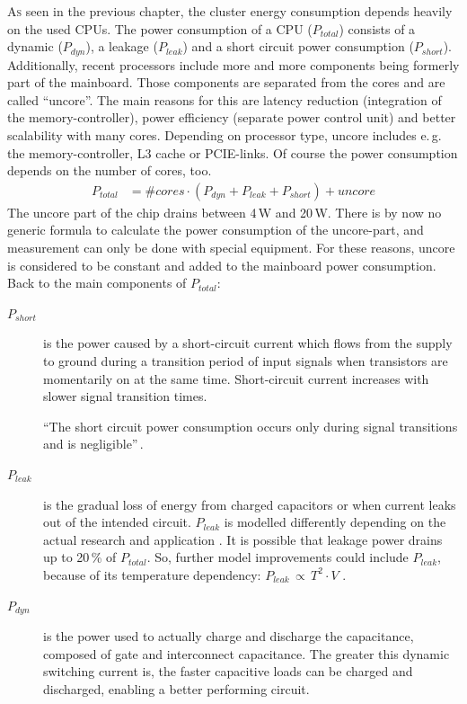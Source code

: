 \bigskip
\lettrine[lines=2, lhang=.1, lraise=.1]{A}{s} seen in the previous chapter, the cluster energy consumption depends heavily on the used CPUs. The power consumption of a CPU ($P_{total}$) consists of a dynamic ($P_{dyn}$), a leakage ($P_{leak}$) and a short circuit power consumption ($P_{short}$). Additionally, recent processors include more and more components being formerly part of the mainboard. Those components are separated from the cores and are called ``uncore''. The main reasons for this are latency reduction (integration of the memory-controller), power efficiency (separate power control unit) and better scalability with many cores. Depending on processor type, uncore includes e.\,g. the memory-controller, L3 cache or PCIE-links. Of course the power consumption depends on the number of cores, too.
%
\begin{align}
P_{total} &= \#cores \cdot ( P_{dyn} + P_{leak} + P_{short} ) + uncore\nonumber
\end{align}
%
The uncore part of the chip drains between 4\,W and 20\,W. There is by now no generic formula to calculate the power consumption of the uncore-part, and measurement can only be done with special equipment\cite{ht4uCPU}. For these reasons, uncore is considered to be constant and added to the mainboard power consumption.\\[4em]
%
Back to the main components of $P_{total}$:
%
\begin{description}
	\item[$P_{short}$] is the power caused by a short-circuit current which flows from the supply to ground during a transition period of input signals when transistors are momentarily on at the same time. Short-circuit current increases with slower signal transition times\cite{HOT96}.

``The short circuit power consumption occurs only during signal transitions and is negligible''\,\cite{martin}.

	\item[$P_{leak}$] is the gradual loss of energy from charged capacitors or when current leaks out of the intended circuit. $P_{leak}$ is modelled differently depending on the actual research and application \cite{martin, power, temp}. It is possible that leakage power drains up to 20\,\% of $P_{total}$. So, further model improvements could include $P_{leak}$, because of its temperature dependency: $ P_{leak}\,\propto \, T^2 \cdot V$ \cite{tempaware}.
	\item[$P_{dyn}$] is the power used to actually charge and discharge the capacitance, composed of gate and interconnect capacitance.
%
The greater this dynamic switching current is, the faster capacitive loads can be charged and discharged, enabling a better performing circuit.
\end{description}

